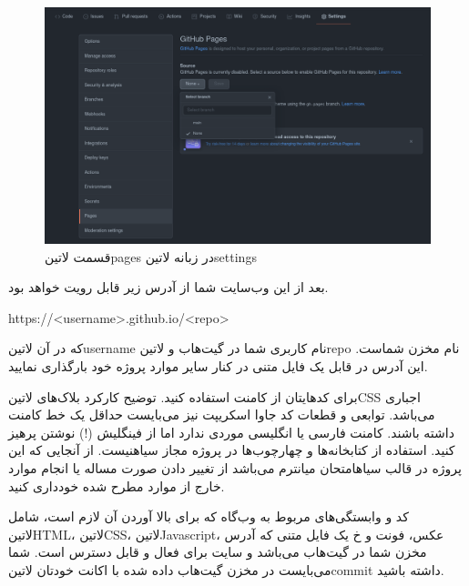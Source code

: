 \documentclass[../main.tex]{subfiles}
\begin{document}
\begin{figure}[h]
  \centering
  \includegraphics[scale=0.3]{./github-step-2}
  \caption{قسمت ‌لاتین{pages} در زبانه ‌لاتین{settings}}
\end{figure}

بعد از این وب‌سایت شما از آدرس زیر قابل رویت خواهد بود.

\begin{latin}\begin{center}
https://<username>.github.io/<repo>
\end{center}\end{latin}

که در آن ‌لاتین{username} نام کاربری شما در گیت‌هاب و ‌لاتین{repo} نام مخزن شماست. این آدرس در قابل یک فایل متنی در کنار سایر موارد پروژه خود بارگذاری نمایید.


 برای کدهایتان از کامنت استفاده کنید. توضیح کارکرد بلاک‌های ‌لاتین{CSS} اجباری می‌باشد. توابعی و قطعات کد جاوا اسکریپت نیز می‌بایست حداقل یک خط کامنت داشته باشند.
 کامنت فارسی یا انگلیسی موردی ندارد اما از فینگلیش (!) نوشتن پرهیز کنید.
 استفاده از کتابخانه‌ها و چهارچوب‌ها در پروژه مجاز ‌سیاه{نیست}.
 از آنجایی که این پروژه در قالب ‌سیاه{امتحان میانترم} می‌باشد از تغییر دادن صورت مساله یا انجام موارد خارج از موارد مطرح شده خودداری کنید.


 کد و وابستگی‌های مربوط به وب‌گاه که برای بالا آوردن آن لازم است، شامل ‌لاتین{HTML}، ‌لاتین{CSS}، ‌لاتین{Javascript}، عکس، فونت و ‌خ
 یک فایل متنی که آدرس مخزن شما در گیت‌هاب می‌باشد و سایت برای فعال و قابل دسترس است.
 شما می‌بایست در مخزن گیت‌هاب داده شده با اکانت خودتان ‌لاتین{commit} داشته باشید.
\end{document}
